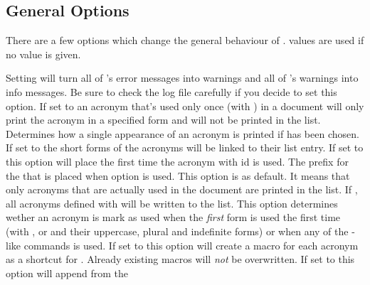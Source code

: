 \documentclass[load-preamble+]{cnltx-doc}
\begin{document}
\subsection{General Options}
There are a few options which change the general behaviour of \acro.
 values are used if no value is given.
\begin{options}
    Setting  will turn all of \acro's error messages
    into warnings and all of \acro's warnings into info messages.  Be sure to
    check the log file carefully if you decide to set this option.
    If set to  an acronym that's used only once (with ) in a
    document will only print the acronym in a specified form and will not be
    printed in the list.
    Determines how a single appearance of an acronym is
    printed if  has been chosen.
    If set to  the short forms of the acronyms will be linked to
    their list entry.
    If set to  this option will place
     the first time the acronym with
    \ac{id}  is used. 
    The prefix for the  that is placed when option
     is used.
    This option is  as default.  It means that only acronyms that
    are actually used in the document are printed in the list.  If
    , all acronyms defined with  will be
    written to the list.
    This option determines wether an acronym is mark as used when the
    \emph{first} form is used the first time (with ,  or
     and their uppercase, plural and indefinite forms) or when any
    of the -like commands is used.   
    If set to  this option will create a macro  for
    each acronym as a shortcut for .  Already existing macros
    will \emph{not} be overwritten.
    If set to  this option will append  from the

\end{options}
\end{document}
